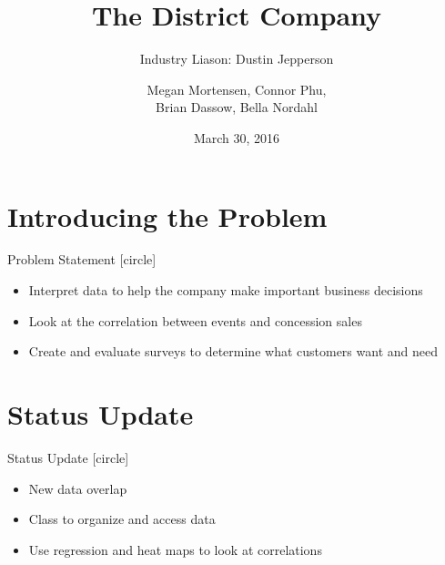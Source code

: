 \documentclass[compress,blue]{beamer}
\title{The District Company}
\subtitle{Industry Liason: Dustin Jepperson}
\author{Megan Mortensen, Connor Phu, \\
Brian Dassow, Bella Nordahl}
\institute{\textbf{University of Wisconsin Stout} \\
}
\date{March 30, 2016}
\begin{document}
\frame{\titlepage}



\section{Introducing the Problem}

\begin{frame}{Problem Statement}
[circle]
\begin{itemize}
	\item Interpret data to help the company make important business decisions
	\item Look at the correlation between events and concession sales
	\item Create and evaluate surveys to determine what customers want and need
\end{itemize}
\end{frame}


\section{Status Update}

\begin{frame}{Status Update}
[circle]
\begin{itemize}
  \item New data overlap
  \item Class to organize and access data
  \item Use regression and heat maps to look at correlations 
\end{itemize}
\end{frame}
\end{document}

